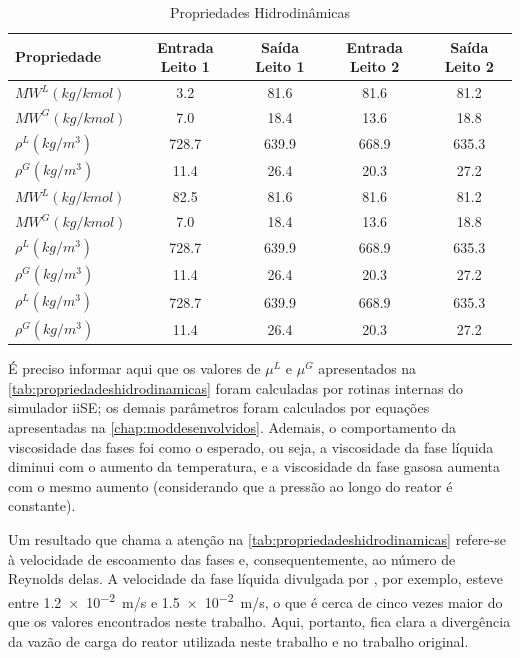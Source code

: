 \begin{table}[!htb]
\begin{center}
\caption{Propriedades Hidrodinâmicas}
\label{tab:propriedadeshidrodinamicas}
\small
\begin{tabular}{lcccc}
{Propriedade} & {Entrada Leito 1} & {Saída Leito 1} & {Entrada Leito 2} &
{Saída Leito 2}
\\
\hline
{${MW^{L} (kg/kmol)}$} & 3.2 & 81.6 & 81.6 & 81.2 \\
{${MW^{G} (kg/kmol)}$} & 7.0 & 18.4 & 13.6 & 18.8 \\
{$\rho^{L}(kg/m^{3})$} & 728.7 & 639.9 & 668.9 & 635.3 \\
{$\rho^{G}(kg/m^{3})$} & 11.4 & 26.4 & 20.3 & 27.2 \\
{${MW^{L} (kg/kmol)}$} & 82.5 & 81.6 & 81.6 & 81.2 \\
{${MW^{G} (kg/kmol)}$} & 7.0 & 18.4 & 13.6 & 18.8 \\
{$\rho^{L}(kg/m^{3})$} & 728.7 & 639.9 & 668.9 & 635.3 \\
{$\rho^{G}(kg/m^{3})$} & 11.4 & 26.4 & 20.3 & 27.2 \\
{$\rho^{L}(kg/m^{3})$} & 728.7 & 639.9 & 668.9 & 635.3 \\
{$\rho^{G}(kg/m^{3})$} & 11.4 & 26.4 & 20.3 & 27.2 \\
\bottomrule
\end{tabular}
\end{center}
\end{table}

É preciso informar aqui que os valores de $\mu^L$ e $\mu^G$ apresentados na
\autoref{tab:propriedadeshidrodinamicas} foram calculadas por rotinas internas
do simulador iiSE; os demais parâmetros foram calculados por equações
apresentadas na \autoref{chap:moddesenvolvidos}. Ademais, o comportamento da
viscosidade das fases foi como o esperado, ou seja, a viscosidade da fase
líquida diminui com o aumento da temperatura, e a viscosidade da fase gasosa
aumenta com o mesmo aumento (considerando que a pressão ao longo do reator é
constante).

Um resultado que chama a atenção na \autoref{tab:propriedadeshidrodinamicas}
refere-se à velocidade de escoamento das fases e, consequentemente, ao número de
Reynolds delas. A velocidade da fase líquida divulgada por
, por exemplo, esteve entre \SI{1,2e-2}{m/s} e
\SI{1,5e-2}{m/s}, o que é cerca de cinco vezes maior do que os valores
encontrados neste trabalho. Aqui, portanto, fica clara a divergência da vazão de
carga do reator utilizada neste trabalho e no trabalho original.

